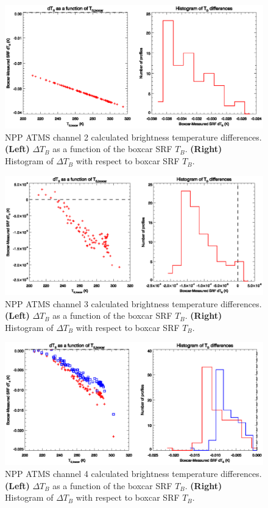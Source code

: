 \begin{figure}[H]
  \centering
  \includegraphics[scale=1]{graphics/dtb/atms_npp.ch2.TbStats.eps}
  \caption{NPP ATMS channel 2 calculated brightness temperature differences. \textbf{(Left)} $\Delta T_B$ as a function of the boxcar SRF $T_B$. \textbf{(Right)} Histogram of $\Delta T_B$ with respect to boxcar SRF $T_B$.}
  \label{fig:atms_npp.ch2.dtb}
\end{figure}

\begin{figure}[H]
  \centering
  \includegraphics[scale=1]{graphics/dtb/atms_npp.ch3.TbStats.eps}
  \caption{NPP ATMS channel 3 calculated brightness temperature differences. \textbf{(Left)} $\Delta T_B$ as a function of the boxcar SRF $T_B$. \textbf{(Right)} Histogram of $\Delta T_B$ with respect to boxcar SRF $T_B$.}
  \label{fig:atms_npp.ch3.dtb}
\end{figure}

\begin{figure}[H]
  \centering
  \includegraphics[scale=1]{graphics/dtb/atms_npp.ch4.TbStats.eps}
  \caption{NPP ATMS channel 4 calculated brightness temperature differences. \textbf{(Left)} $\Delta T_B$ as a function of the boxcar SRF $T_B$. \textbf{(Right)} Histogram of $\Delta T_B$ with respect to boxcar SRF $T_B$.}
  \label{fig:atms_npp.ch4.dtb}
\end{figure}

